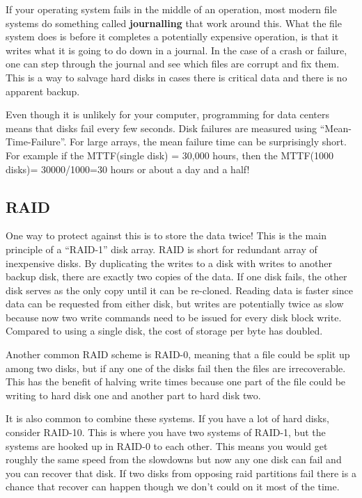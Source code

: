 If your operating system fails in the middle of an operation, most modern file systems do something called \textbf{journalling} that work around this. What the file system does is before it completes a potentially expensive operation, is that it writes what it is going to do down in a journal. In the case of a crash or failure, one can step through the journal and see which files are corrupt and fix them. This is a way to salvage hard disks in cases there is critical data and there is no apparent backup.

Even though it is unlikely for your computer, programming for data centers means that disks fail every few seconds. Disk failures are measured using ``Mean-Time-Failure''. For large arrays, the mean failure time can be surprisingly short. For example if the MTTF(single disk) = 30,000 hours, then the MTTF(1000 disks)= 30000/1000=30 hours or about a day and a half!

\subsection{RAID}

One way to protect against this is to store the data twice! This is the main principle of a ``RAID-1'' disk array. RAID is short for redundant array of inexpensive disks. By duplicating the writes to a disk with writes to another backup disk, there are exactly two copies of the data. If one disk fails, the other disk serves as the only copy until it can be re-cloned. Reading data is faster since data can be requested from either disk, but writes are potentially twice as slow because now two write commands need to be issued for every disk block write. Compared to using a single disk, the cost of storage per byte has doubled.

Another common RAID scheme is RAID-0, meaning that a file could be split up among two disks, but if any one of the disks fail then the files are irrecoverable. This has the benefit of halving write times because one part of the file could be writing to hard disk one and another part to hard disk two.

It is also common to combine these systems. If you have a lot of hard disks, consider RAID-10. This is where you have two systems of RAID-1, but the systems are hooked up in RAID-0 to each other. This means you would get roughly the same speed from the slowdowns but now any one disk can fail and you can recover that disk. If two disks from opposing raid partitions fail there is a chance that recover can happen though we don't could on it most of the time.

